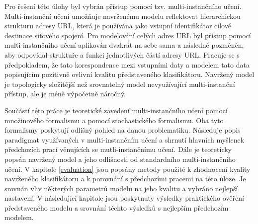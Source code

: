 Pro řešení této úlohy byl vybrán přístup pomocí tzv. multi-instančního učení. Multi-instanční učení umožňuje navrženému modelu reflektovat hierarchickou strukturu adresy URL, která je používána jako vstupní identifikátor cílové destinace síťového spojení. Pro modelování celých adres URL byl přístup pomocí multi-instančního učení aplikován dvakrát na sebe sama a následně pozměněn, aby odpovídal struktuře a funkci jednotlivých částí adresy URL. Pracuje se s předpokladem, že tato korespondence mezi vstupními daty a modelem tato data popisujícím pozitivně ovlivní kvalitu představeného klasifikátoru. Navržený model je topologicky složitější než srovnatelný model nevyužívající multi-instanční přístup, ale je méně výpočetně náročný.

Součástí této práce je teoretické zavedení multi-instančního učení pomocí množinového formalismu a pomocí stochastického formalismu. Oba tyto formalismy poskytují odlišný pohled na danou problematiku. Následuje popis paradigmat využívaných v multi-instančním učení a shrnutí hlavních myšlenek předchozích prací věnujících se mutli-instančnímu učení. Dále je teoreticky popsán navržený model a jeho odlišnosti od standardního multi-instančního učení. V kapitole \ref{evaluation} jsou popsány metody použité k zhodnocení kvality navrženého klasifikátoru a k porovnání s předchozími pracemi na této úloze. Je srovnán vliv některých parametrů modelu na jeho kvalitu a vybráno nejlepší nastavení. V následující kapitole jsou poskytnuty výsledky praktického ověření představeného modelu a srovnání těchto výsledků s nejlepším předchozím modelem.
